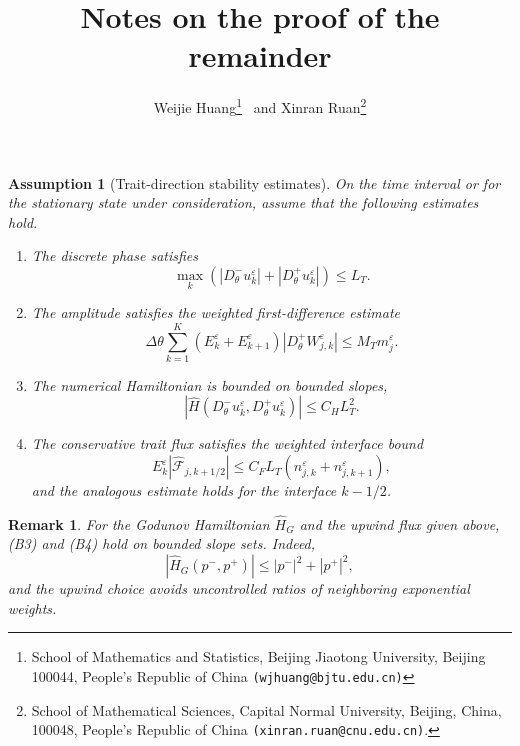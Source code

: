 \documentclass[11pt, dina4, amsfont12]{article}
\title{Notes on the proof of the remainder}
\author{
Weijie Huang\thanks{School of Mathematics and Statistics, Beijing Jiaotong University, Beijing 100044, People's Republic of China {\tt (wjhuang@bjtu.edu.cn)}} \ and
Xinran Ruan\thanks{School of Mathematical Sciences, Capital Normal University, Beijing, China, 100048, People's Republic of China {\tt (xinran.ruan@cnu.edu.cn)}.}
}
\newtheorem{remark}{Remark}[section]
\newtheorem{assumption}{Assumption}[section]
\begin{document}
\date{}
\maketitle
\begin{assumption}[Trait-direction stability estimates]
\label{ass:trait_stability}
On the time interval or for the stationary state under consideration, assume
that the following estimates hold.

\begin{enumerate}
\item[(B1)] The discrete phase satisfies
\[
    \max_k
    \left(
        |D_\theta^-u_k^\varepsilon|
        +
        |D_\theta^+u_k^\varepsilon|
    \right)
    \le L_T .
\]

\item[(B2)] The amplitude satisfies the weighted first-difference estimate
\[
    \Delta\theta
    \sum_{k=1}^K
    \left(
        E_k^\varepsilon+E_{k+1}^\varepsilon
    \right)
    |D_\theta^+W_{j,k}^\varepsilon|
    \le
    M_T m_j^\varepsilon .
\]

\item[(B3)] The numerical Hamiltonian is bounded on bounded slopes,
\[
    \left|
    \widehat H
    \left(
        D_\theta^-u_k^\varepsilon,
        D_\theta^+u_k^\varepsilon
    \right)
    \right|
    \le
    C_H L_T^2 .
\]

\item[(B4)] The conservative trait flux satisfies the weighted interface
bound
\[
    E_k^\varepsilon
    \left|
    \widehat{\mathcal F}_{j,k+1/2}
    \right|
    \le
    C_F L_T
    \left(
        n_{j,k}^\varepsilon+n_{j,k+1}^\varepsilon
    \right),
\]
and the analogous estimate holds for the interface \(k-1/2\).
\end{enumerate}
\end{assumption}

\begin{remark}
For the Godunov Hamiltonian \(\widehat H_G\) and the upwind flux given above,
(B3) and (B4) hold on bounded slope sets. Indeed,
\[
    |\widehat H_G(p^-,p^+)|
    \le
    |p^-|^2+|p^+|^2,
\]
and the upwind choice avoids uncontrolled ratios of neighboring exponential
weights.
\end{remark}
\end{document}
